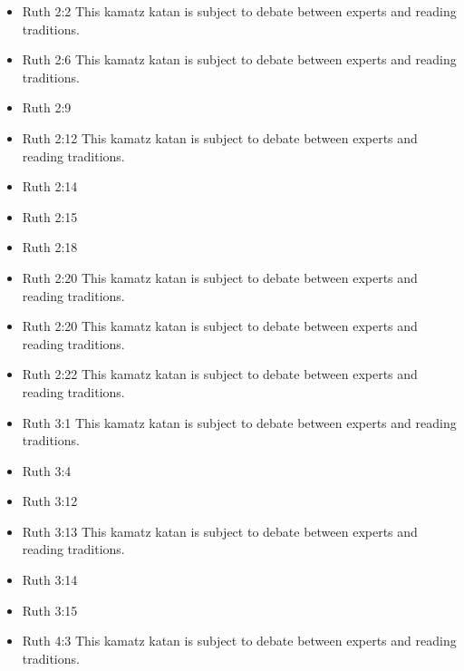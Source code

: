\documentclass[14pt]{book}
\begin{document}
\begin{multicols}{2}
\begin{itemize}
	\item Ruth 2:2 This kamatz katan is subject to debate between experts and reading traditions.
	
	\item Ruth 2:6 This kamatz katan is subject to debate between experts and reading traditions.
	
	\item Ruth 2:9
	
	\item Ruth 2:12 This kamatz katan is subject to debate between experts and reading traditions.
	
	\item Ruth 2:14
	
	\item Ruth 2:15
	
	\item Ruth 2:18
	
	\item Ruth 2:20 This kamatz katan is subject to debate between experts and reading traditions.
	
	\item Ruth 2:20 This kamatz katan is subject to debate between experts and reading traditions.
	
	\item Ruth 2:22 This kamatz katan is subject to debate between experts and reading traditions.
	
	\item Ruth 3:1 This kamatz katan is subject to debate between experts and reading traditions.
	
	\item Ruth 3:4
	
	\item Ruth 3:12
	
	\item Ruth 3:13 This kamatz katan is subject to debate between experts and reading traditions.
	
	\item Ruth 3:14
	
	\item Ruth 3:15
	
	\item Ruth 4:3 This kamatz katan is subject to debate between experts and reading traditions.
	

\end{itemize}
\end{multicols}
\end{document}
